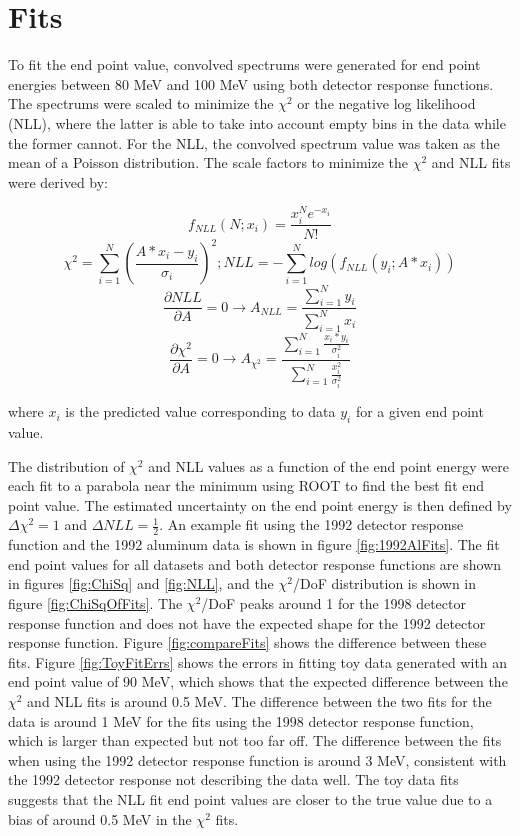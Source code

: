 
\section { Fits }

To fit the end point value, convolved spectrums were generated for end point energies
between 80 MeV and 100 MeV using both detector response functions. The spectrums were scaled to minimize the $\chi^2$
or the negative log likelihood (NLL), where the latter is able to take into account empty
bins in the data while the former cannot. For the NLL, the convolved spectrum value was taken as the mean of
a Poisson distribution. The scale factors to minimize the $\chi^2$ and NLL fits were derived by:

$$f_{NLL}(N;x_i) = \frac{x_i^N e^{-x_i}}{N!}$$
$$\chi^2 = \sum^N_{i=1} (\frac{A*x_i - y_i}{\sigma_i})^2; NLL = -\sum^N_{i=1}log(f_{NLL}(y_i;A*x_i))$$
$$\frac{\partial NLL}{\partial A} = 0 \rightarrow A_{NLL} = \frac{\sum^N_{i=1} y_i}{\sum^N_{i=1} x_i} $$
$$\frac{\partial \chi^2}{\partial A} = 0 \rightarrow A_{\chi^2} = \frac{\sum^N_{i=1} \frac{x_i*y_i}{\sigma_i^2}}{\sum^N_{i=1} \frac{x_i^2}{\sigma_i^2}} $$

\noindent
where $x_i$ is the predicted value corresponding to data $y_i$ for a given end point value.

The distribution of $\chi^2$ and NLL values as a function of the end point energy were each fit to a parabola near 
the minimum using ROOT to find the best fit end point value. The estimated uncertainty on the end point energy is then
defined by $\Delta \chi^2 = 1$ and $\Delta NLL = \frac{1}{2}$. An example fit using the 1992 detector response function
and the 1992 aluminum data is shown in figure \ref{fig:1992AlFits}. The fit end point values for all 
datasets and both detector response functions are shown in figures \ref{fig:ChiSq} and \ref{fig:NLL}, and the $\chi^2$/DoF
distribution is shown in figure \ref{fig:ChiSqOfFits}. The $\chi^2$/DoF peaks around 1 for the 1998 detector response 
function and does not have the expected shape for the 1992 detector response function. Figure \ref{fig:compareFits}
shows the difference between these fits. Figure \ref{fig:ToyFitErrs} shows the errors in fitting toy data generated with
an end point value of 90 MeV, which shows that the expected difference between the $\chi^2$ and NLL fits is around 0.5 MeV.
The difference between the two fits for the data is around 1 MeV for the fits using the 1998 detector response function,
which is larger than expected but not too far off. The difference between the fits when using the 1992 detector response function
is around 3 MeV, consistent with the 1992 detector response not describing the data well.
The toy data fits suggests that the NLL fit end point values are closer to the true value due to a bias of around 0.5 MeV 
in the $\chi^2$ fits.

